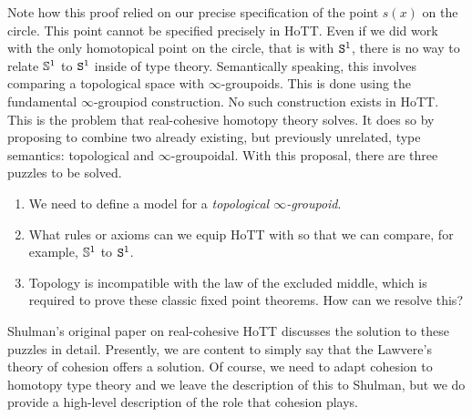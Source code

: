 \documentclass{amsart}
\begin{document}
Note how this proof relied on our precise specification of
the point $ s(x) $ on the circle.  This point cannot be
specified precisely in HoTT. Even if we did work with the
only homotopical point on the circle, that is with $ \S^1 $,
there is no way to relate $ \SS^1 $ to $ \S^1 $ inside of
type theory. Semantically speaking, this involves comparing
a topological space with $ \infty $-groupoids. This is done
using the fundamental $ \infty $-groupiod construction.  No
such construction exists in HoTT. This is the problem that
real-cohesive homotopy theory solves. It does so by
proposing to combine two already existing, but previously
unrelated, type semantics: topological and
$ \infty $-groupoidal. With this proposal, there are three
puzzles to be solved.

\begin{enumerate}
\item We need to define a model for a \emph{topological $ \infty
    $-groupoid}.
\item What rules or axioms can we equip HoTT with so that we
  can compare, for example, $ \SS^1 $ to $ \S^1 $.
\item Topology is incompatible with the law of the excluded
  middle, which is required to prove these classic fixed
  point theorems. How can we resolve this?
\end{enumerate}

Shulman's original paper on real-cohesive HoTT
\cite{shul:bfp} discusses the solution to these puzzles in
detail. Presently, we are content to simply say that the
Lawvere's theory of cohesion offers a solution. Of course,
we need to adapt cohesion to homotopy type theory and we
leave the description of this to Shulman, but we do provide
a high-level description of the role that cohesion plays.
\end{document}
